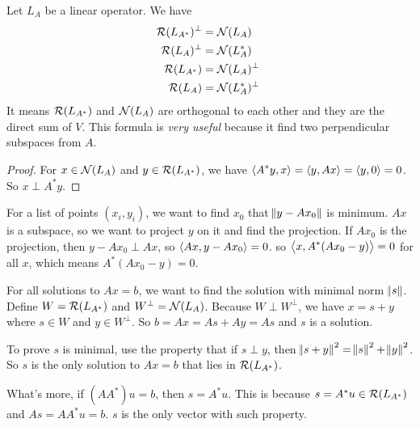 \begin{theorem}
    Let $L_A$ be a linear operator. We have
    \begin{equation}
        \begin{aligned}
            \mathcal{R}(L_{A^*})^\perp &= \mathcal{N}(L_A) \\
            \mathcal{R}(L_{A})^\perp &= \mathcal{N}(L_A^*) \\
            \mathcal{R}(L_{A^*}) &= \mathcal{N}(L_A)^\perp \\
            \mathcal{R}(L_{A}) &= \mathcal{N}(L_A^*)^\perp \
        \end{aligned}        
    \end{equation}
    It means $\mathcal{R}(L_{A^*})$ and $\mathcal{N}(L_A)$ are orthogonal to each other and they are the direct sum of $V$. This formula is \emph{very useful} because it find two perpendicular subspaces from $A$.
\end{theorem}
\begin{proof}
    For $x \in \mathcal{N}(L_A)$ and $y \in \mathcal{R}(L_{A^*})$, we have $\left\langle \displaystyle A^*y, x \right\rangle = \left\langle \displaystyle y, Ax \right\rangle = \left\langle \displaystyle y, 0 \right\rangle = 0$. So $x \perp A^*y$.
\end{proof}



\begin{example}
    For a list of points $(x_i, y_i)$, we want to find $x_0$ that $\norm{y - Ax_0}$ is minimum. $Ax$ is a subspace, so we want to project $y$ on it and find the projection. If $Ax_0$ is the projection, then $y - Ax_0 \perp Ax$, so $\left\langle \displaystyle Ax, y - Ax_0 \right\rangle = 0$. so $\left\langle \displaystyle x, A^* (Ax_0 - y) \right\rangle = 0$ for all $x$, which means $A^* (Ax_0 - y) = 0$.
\end{example}

\begin{example}
    For all solutions to $Ax=b$, we want to find the solution with minimal norm $\norm{s}$. Define $W = \mathcal{R}(L_{A^*})$ and $W^\perp = \mathcal{N}(L_A)$. Because $W \perp W^\perp$, we have $x = s + y$ where $s \in W$ and $y \in W^\perp$. So $b = Ax = As + Ay = As$ and $s$ is a solution.
    
    To prove $s$ is minimal, use the property that if $s \perp y$, then $\norm{s+y}^2 = \norm{s}^2 + \norm{y}^2$. So $s$ is the only solution to $Ax=b$ that lies in $\mathcal{R}(L_{A^*})$.
    
    What's more, if $(AA^*)u = b$, then $s = A^* u$. This is because $s = A^* u \in \mathcal{R}(L_{A^*})$ and $As = AA^*u = b$. $s$ is the only vector with such property.
\end{example}

